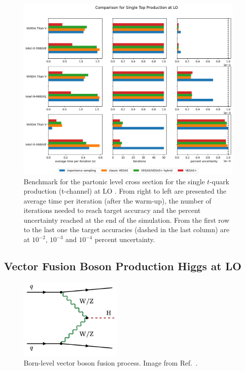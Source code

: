 \documentclass[../main/main.tex]{subfiles}
\begin{document}
\begin{figure}[]
	\centering
	\includegraphics[width=\textwidth]{../images/singletop_final.png}
	\caption{Benchmark  for the partonic level cross section for the single $t$-quark production (t-channel)  at LO \cite{Brucherseifer_2014}. From right to left are presented the average time per iteration (after the warm-up), the number of iterations needed to reach target accuracy and the percent uncertainty reached at the end of the simulation. From the first row to the last one the target accuracies (dashed in the last column) are at $10^{-2}$, $10^{-3}$ and $10^{-4}$ percent uncertainty.}
	\label{singletop_plot}
\end{figure}
 
\subsection{Vector Fusion Boson Production Higgs at LO}

\begin{figure}[]
	\centering
	\includegraphics[width=5cm]{../images/vfb_image.png}
	\caption{ Born-level vector boson fusion process. Image from Ref.~\cite{Cruz_Martinez_2018}.}
	\label{vfb}
\end{figure}
\end{document}
